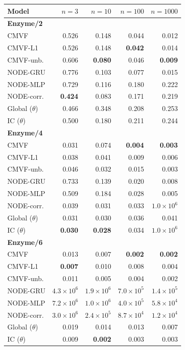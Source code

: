 \begin{tabular*}{\linewidth}{@{\extracolsep{\fill}}lrrrr}
\toprule
Model & $n=3$ & $n=10$ & $n=100$ & $n=1000$ \\
\midrule
\multicolumn{5}{l}{\textbf{Enzyme/2}} \\
CMVF & 0.526 & 0.148 & 0.044 & 0.012 \\
CMVF-L1 & 0.526 & 0.148 & \textbf{0.042} & 0.014 \\
CMVF-unb. & 0.606 & \textbf{0.080} & 0.046 & \textbf{0.009} \\
NODE-GRU & 0.776 & 0.103 & 0.077 & 0.015 \\
NODE-MLP & 0.729 & 0.116 & 0.180 & 0.222 \\
NODE-corr. & \textbf{0.424} & 0.083 & 0.171 & 0.219 \\
Global ($\theta$) & 0.466 & 0.348 & 0.208 & 0.253 \\
IC ($\theta$) & 0.500 & 0.180 & 0.211 & 0.244 \\
\midrule
\multicolumn{5}{l}{\textbf{Enzyme/4}} \\
CMVF & 0.031 & 0.074 & \textbf{0.004} & \textbf{0.003} \\
CMVF-L1 & 0.038 & 0.041 & 0.009 & 0.006 \\
CMVF-unb. & 0.046 & 0.032 & 0.015 & 0.003 \\
NODE-GRU & 0.733 & 0.139 & 0.020 & 0.008 \\
NODE-MLP & 0.509 & 0.184 & 0.028 & 0.005 \\
NODE-corr. & 0.039 & 0.031 & 0.033 & $1.0\!\times\!10^{6}$ \\
Global ($\theta$) & 0.031 & 0.030 & 0.036 & 0.041 \\
IC ($\theta$) & \textbf{0.030} & \textbf{0.028} & 0.034 & $1.0\!\times\!10^{6}$ \\
\midrule
\multicolumn{5}{l}{\textbf{Enzyme/6}} \\
CMVF & 0.013 & 0.007 & \textbf{0.002} & \textbf{0.002} \\
CMVF-L1 & \textbf{0.007} & 0.010 & 0.008 & 0.004 \\
CMVF-unb. & 0.011 & 0.005 & 0.004 & 0.002 \\
NODE-GRU & $4.3\!\times\!10^{6}$ & $1.9\!\times\!10^{6}$ & $7.0\!\times\!10^{5}$ & $1.4\!\times\!10^{5}$ \\
NODE-MLP & $7.2\!\times\!10^{6}$ & $1.0\!\times\!10^{6}$ & $4.0\!\times\!10^{5}$ & $5.8\!\times\!10^{4}$ \\
NODE-corr. & $3.0\!\times\!10^{6}$ & $2.4\!\times\!10^{5}$ & $8.7\!\times\!10^{4}$ & $1.2\!\times\!10^{4}$ \\
Global ($\theta$) & 0.019 & 0.014 & 0.013 & 0.007 \\
IC ($\theta$) & 0.009 & \textbf{0.002} & 0.003 & 0.003 \\
\bottomrule
\end{tabular*}
